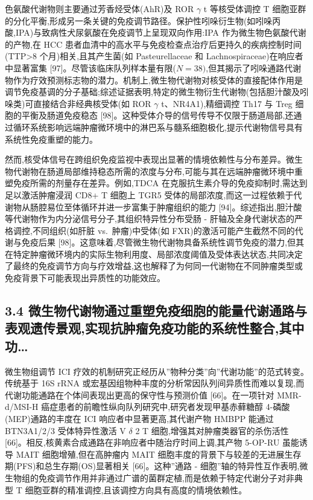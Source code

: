 色氨酸代谢物则主要通过芳香烃受体(AhR)及 ROR \(\gamma\) t 等核受体调控 T 细胞亚群的分化平衡,形成另一条关键的免疫调节路径。保护性吲哚衍生物(如吲哚丙酸,IPA)与致病性犬尿氨酸在免疫调节上呈现双向作用:IPA 作为微生物色氨酸代谢的产物,在 HCC 患者血清中的高水平与免疫检查点治疗后更持久的疾病控制时间(TTP\textgreater8 个月)相关,且其产生菌(如 Pasteurellaceae 和 Lachnospiraceae)在响应者中显著富集 {[}97{]}。尽管该临床队列样本量有限(\(N=38)\),但其揭示了吲哚通路代谢物作为疗效预测标志物的潜力。机制上,微生物代谢物对核受体的直接配体作用是调节免疫基调的分子基础;综述证据表明,特定的微生物衍生代谢物(包括胆汁酸及吲哚类)可直接结合非经典核受体(如 ROR \(\gamma\) t、NR4A1),精细调控 Th17 与 Treg 细胞的平衡及肠道免疫稳态 {[}98{]}。这种受体介导的信号传导不仅限于肠道局部,还通过循环系统影响远端肿瘤微环境中的淋巴系与髓系细胞极化,提示代谢物信号具有系统性免疫重塑的能力。

然而,核受体信号在跨组织免疫监视中表现出显著的情境依赖性与分布差异。微生物代谢物在肠道局部维持稳态所需的浓度与分布,可能与其在远端肿瘤微环境中重塑免疫所需的剂量存在差异。例如,TDCA 在克服抗生素介导的免疫抑制时,需达到足以激活肿瘤浸润 CD8+ T 细胞上 TGR5 受体的局部浓度,而这一过程依赖于代谢物从肠腔易位至体循环并进一步富集于肿瘤组织的能力 {[}94{]}。综述指出,胆汁酸等代谢物作为内分泌信号分子,其组织特异性分布受肠 - 肝轴及全身代谢状态的严格调控,不同组织(如肝脏 vs.~肿瘤)中受体(如 FXR)的激活可能产生截然不同的代谢与免疫后果 {[}98{]}。这意味着,尽管微生物代谢物具备系统性调节免疫的潜力,但其在特定肿瘤微环境内的实际生物利用度、局部浓度阈值及受体表达状态,共同决定了最终的免疫调节方向与疗效增益,这也解释了为何同一代谢物在不同肿瘤类型或免疫背景下可能表现出异质性的功能效应。

\subsection{3.4 微生物代谢物通过重塑免疫细胞的能量代谢通路与表观遗传景观,实现抗肿瘤免疫功能的系统性整合,其中功\ldots{}}\label{ux5faeux751fux7269ux4ee3ux8c22ux7269ux901aux8fc7ux91cdux5851ux514dux75abux7ec6ux80deux7684ux80fdux91cfux4ee3ux8c22ux901aux8defux4e0eux8868ux89c2ux9057ux4f20ux666fux89c2ux5b9eux73b0ux6297ux80bfux7624ux514dux75abux529fux80fdux7684ux7cfbux7edfux6027ux6574ux5408ux5176ux4e2dux529f}

微生物组调节 ICI 疗效的机制研究正经历从''物种分类''向''代谢功能''的范式转变。传统基于 16S rRNA 或宏基因组物种丰度的分析常因队列间异质性而难以复现,而代谢功能通路在个体间表现出更高的保守性与预测价值 {[}66{]}。在一项针对 MMR-d/MSI-H 癌症患者的前瞻性纵向队列研究中,研究者发现甲基赤藓糖醇 4-磷酸(MEP)通路的丰度在 ICI 响应者中显著更高,其代谢产物 HMBPP 能通过 BTN3A1/2/3 受体特异性激活 V \(\delta\) 2 T 细胞,增强其对肿瘤类器官的杀伤活性 {[}66{]}。相反,核黄素合成通路在非响应者中随治疗时间上调,其产物 5-OP-RU 虽能诱导 MAIT 细胞增殖,但在高肿瘤内 MAIT 细胞丰度的背景下与较差的无进展生存期(PFS)和总生存期(OS)显著相关 {[}66{]}。这种''通路 - 细胞''轴的特异性互作表明,微生物组的免疫调节作用并非通过广谱的菌群定植,而是依赖于特定代谢分子对非典型 T 细胞亚群的精准调控,且该调控方向具有高度的情境依赖性。

